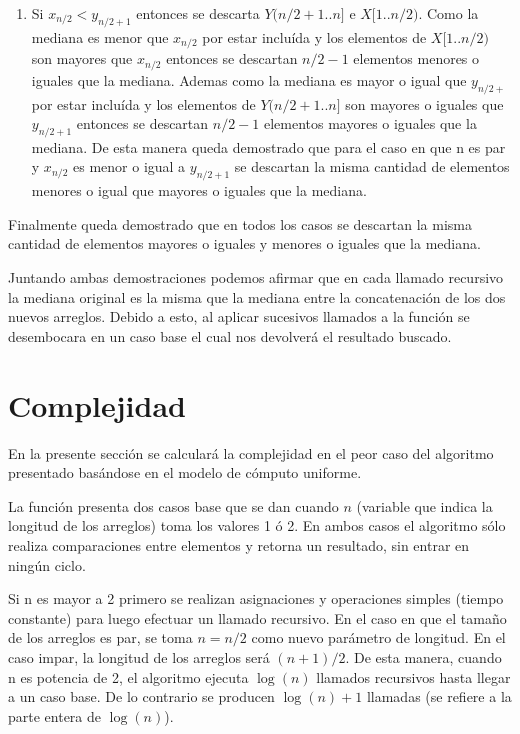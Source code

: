 \documentclass[a4paper,10pt] {article}
\begin{document}
\begin{enumerate}
\begin{enumerate}
\item
Si $x_{n/2} < y_{n/2+1}$ entonces se descarta $Y(n/2+1..n]$ e $X[1..n/2)$. Como la mediana es menor que $x_{n/2}$ por estar inclu\'ida y los elementos de $X[1..n/2)$ son mayores que $x_{n/2}$ entonces se descartan $n/2-1$ elementos menores o iguales que la mediana. Ademas como la mediana es mayor o igual que $y_{n/2+}$ por estar inclu\'ida y los elementos de $Y(n/2+1..n]$ son mayores o iguales que $y_{n/2+1}$ entonces se descartan $n/2-1$ elementos mayores o iguales que la mediana. De esta manera queda demostrado que para el caso en que n es par y $x_{n/2}$ es menor o igual a $y_{n/2+1}$ se descartan la misma cantidad de elementos menores o igual que mayores o iguales que la mediana.
\end{enumerate}

\end{enumerate}

Finalmente queda demostrado que en todos los casos se descartan la misma cantidad de elementos mayores o iguales y menores o iguales que la mediana.

Juntando ambas demostraciones podemos afirmar que en cada llamado recursivo la mediana original es la misma que la mediana entre la concatenaci\'on de los dos nuevos arreglos. Debido a esto, al aplicar sucesivos llamados a la funci\'on se desembocara en un caso base el cual nos devolver\'a el resultado buscado.

\section*{Complejidad}
 
En la presente secci\'on se calcular\'a la complejidad en el peor caso del algoritmo presentado bas\'andose en el modelo de c\'omputo uniforme.

La funci\'on presenta dos casos base que se dan cuando $n$ (variable que indica la longitud de los arreglos) toma los valores 1 \'o 2. En ambos casos el algoritmo s\'olo realiza comparaciones entre elementos y retorna un resultado, sin entrar en ning\'un ciclo.

Si n es mayor a 2 primero se realizan asignaciones y operaciones simples (tiempo constante) para luego efectuar un llamado recursivo. En el caso en que el tama\~{n}o de los arreglos es par, se toma $n=n/2$ como nuevo par\'ametro de longitud. En el caso impar, la longitud de los arreglos ser\'a $(n+1)/2$. De esta manera, cuando n es potencia de 2, el algoritmo ejecuta $\log(n)$ llamados recursivos hasta llegar a un caso base. De lo contrario se producen $\log(n)+1$ llamadas (se refiere a la parte entera de $\log(n)$).
\end{document}

